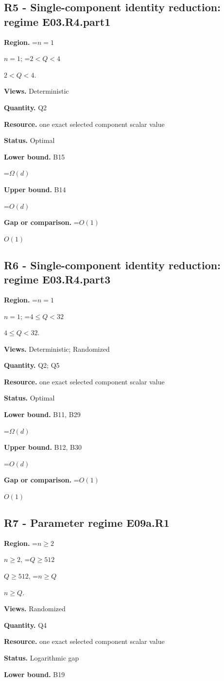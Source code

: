 \documentclass[10pt,a4paper]{article}
\newcommand{\AtlasMath}[1]{\par\begingroup\centering\setbox0=\hbox{$\displaystyle #1$}\ifdim\wd0>1.4\linewidth\typeout{ATLAS WIDE FORMULA: \the\wd0}\fi\ifdim\wd0>\linewidth\resizebox{\linewidth}{!}{\box0}\else\box0\fi\par\endgroup}
\newcommand{\AtlasInlineMath}[1]{\begingroup\setbox0=\hbox{$#1$}\ifdim\wd0>.4\linewidth\endgroup\AtlasMath{#1}\else\endgroup$#1$\fi}
\begin{document}
\subsection{R5 - Single-component identity reduction: regime E03.R4.part1}
\textbf{Region.} \AtlasInlineMath{n=1}; \AtlasInlineMath{2<Q<4}.

\textbf{Views.} Deterministic

\textbf{Quantity.} Q2

\textbf{Resource.} one exact selected component scalar value

\textbf{Status.} Optimal

\textbf{Lower bound.} B15

\AtlasMath{\Omega(d)}
\textbf{Upper bound.} B14

\AtlasMath{O(d)}
\textbf{Gap or comparison.} \AtlasInlineMath{O(1)}

\subsection{R6 - Single-component identity reduction: regime E03.R4.part3}
\textbf{Region.} \AtlasInlineMath{n=1}; \AtlasInlineMath{4\le Q<32}.

\textbf{Views.} Deterministic; Randomized

\textbf{Quantity.} Q2; Q5

\textbf{Resource.} one exact selected component scalar value

\textbf{Status.} Optimal

\textbf{Lower bound.} B11, B29

\AtlasMath{\Omega(d)}
\textbf{Upper bound.} B12, B30

\AtlasMath{O(d)}
\textbf{Gap or comparison.} \AtlasInlineMath{O(1)}

\subsection{R7 - Parameter regime E09a.R1}
\textbf{Region.} \AtlasInlineMath{n\ge2}, \AtlasInlineMath{Q\ge512}, \AtlasInlineMath{n\ge Q}.

\textbf{Views.} Randomized

\textbf{Quantity.} Q4

\textbf{Resource.} one exact selected component scalar value

\textbf{Status.} Logarithmic gap

\textbf{Lower bound.} B19
\end{document}
